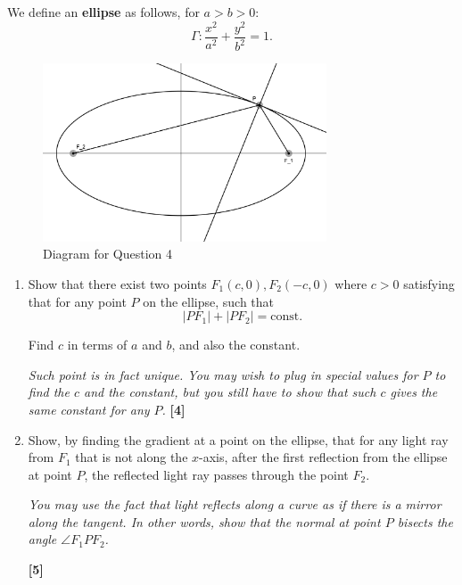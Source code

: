 \documentclass[12pt]{article}
\begin{document}
            We define an \textbf{ellipse} as follows, for \(a > b > 0\):
            \[
            \Gamma: \frac{x^2}{a^2} + \frac{y^2}{b^2} = 1.
            \]

            \begin{figure}
                \centering
                \includegraphics[width = 0.75\textwidth]{Ellipse Diagram.png}
                \caption{Diagram for Question 4}
                \label{fig:Q4Dia}
            \end{figure}

            \begin{enumerate}
                \item Show that there exist two points \(F_1 (c, 0), F_2 (-c, 0)\) where \(c > 0\) satisfying that for any point \(P\) on the ellipse, such that
                \[
                    |PF_1| + |PF_2| = \mathrm{const.}
                \]

                Find \(c\) in terms of \(a\) and \(b\), and also the constant.

                \textit{Such point is in fact unique. You may wish to plug in special values for \(P\) to find the \(c\) and the constant, but you still have to show that such \(c\) gives the same constant for any \(P\).}
                    \hfill\textbf{[4]}

                \item Show, by finding the gradient at a point on the ellipse, that for any light ray from \(F_1\) that is not along the \(x\)-axis, after the first reflection from the ellipse at point \(P\), the reflected light ray passes through the point \(F_2\).

                    \textit{You may use the fact that light reflects along a curve as if there is a mirror along the tangent. In other words, show that the normal at point \(P\) bisects the angle \(\angle F_1 P F_2\).}
                    
                    \hfill\textbf{[5]}
                
            \end{enumerate}
            
\end{document}
